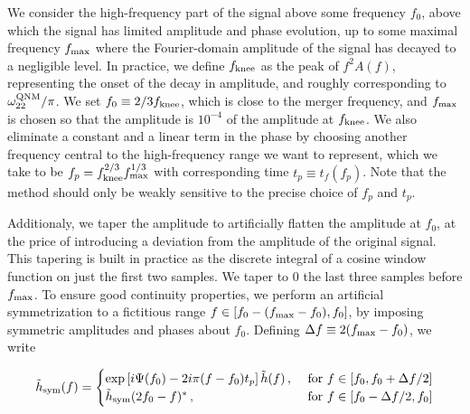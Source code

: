\documentclass[aps,showpacs,twocolumn,
prd,superscriptaddress,nofootinbib]{revtex4-1}
\newcommand{\be}{\begin{equation}}
\newcommand{\ee}{\end{equation}}
\newcommand{\tf}{t_{f}}
\begin{document}
We consider the high-frequency part of the signal above some frequency $f_{0}$, above which the signal has limited amplitude and phase evolution, up to some maximal frequency $f_{\rm max}$ where the Fourier-domain amplitude of the signal has decayed to a negligible level. In practice, we define $f_{\rm knee}$ as the peak of $f^{2}A(f)$, representing the onset of the decay in amplitude, and roughly corresponding to $\omega_{22}^{\rm QNM}/\pi$. We set $f_{0}\equiv 2/3f_{\rm knee}$, which is close to the merger frequency, and $f_{\rm max}$ is chosen so that the amplitude is $10^{-4}$ of the amplitude at $f_{\rm knee}$. We also eliminate a constant and a linear term in the phase by choosing another frequency central to the high-frequency range we want to represent, which we take to be $f_{p} = f_{\rm knee}^{2/3} f_{\rm max}^{1/3}$ with corresponding time $t_{p}\equiv \tf(f_{p})$. Note that the method should only be weakly sensitive to the precise choice of $f_{p}$ and $t_{p}$.

Additionaly, we taper the amplitude to artificially flatten the amplitude at $f_{0}$, at the price of introducing a deviation from the amplitude of the original signal. This tapering is built in practice as the discrete integral of a cosine window function on just the first two samples. We taper to 0 the last three samples before $f_{\rm max}$. To ensure good continuity properties, we perform an artificial symmetrization to a fictitious range $f\in [f_{0} - (f_{\rm max} - f_{0}), f_{0}]$, by imposing symmetric amplitudes and phases about $f_{0}$. Defining $\Delta f \equiv 2 (f_{\rm max} - f_{0})$, we write
\begin{widetext}
\be\label{eq:defhsym}
	\tilde{h}_{\rm sym}(f) = 
	\begin{cases} 
		\exp\left[i \Psi(f_{0}) - 2i\pi (f-f_{0}) t_{p} \right] \tilde{h}(f) \,,  &\text{ for } f \in [f_{0}, f_{0} + \Delta f /2] \\
	\tilde{h}_{\rm sym}(2 f_{0} - f)^{*} \,,  &\text{ for } f \in [f_{0} - \Delta f/2, f_{0}]
	\end{cases}
\ee
\end{widetext}
\end{document}
